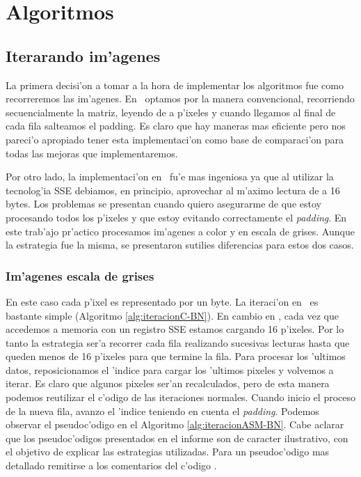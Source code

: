\section{Algoritmos}
\label{sec:algoritmos}

\subsection{Iterarando im'agenes}
La primera decisi'on a tomar a la hora de implementar los algoritmos fue como recorreremos las im'agenes. En \C\ optamos por la manera convencional, recorriendo secuencialmente la matriz, leyendo de a p'ixeles y cuando llegamos al final de cada fila salteamos el padding. Es claro que hay maneras mas eficiente pero nos pareci'o apropiado tener esta implementaci'on como base de comparaci'on para todas las mejoras que implementaremos. 

Por otro lado, la implementaci'on en \ass\ fu'e mas ingeniosa ya que al utilizar la tecnolog'ia SSE debiamos, en principio, aprovechar al m'aximo lectura de a 16 bytes. Los problemas se presentan cuando quiero asegurarme de que estoy procesando todos los p'ixeles y que estoy evitando correctamente el \textit{padding}. En este trab'ajo pr'actico procesamos im'agenes a color y en escala de grises. Aunque la estrategia fue la misma, se presentaron sutilies diferencias para estos dos casos. 


\subsubsection{Im'agenes escala de grises}
En este caso cada p'ixel es representado por un byte. La iteraci'on en \C\ es bastante simple (Algoritmo \ref{alg:iteracionC-BN}). En cambio en \ass, cada vez que accedemos a memoria con un registro SSE estamos cargando 16 p'ixeles. Por lo tanto la estrategia ser'a recorrer cada fila realizando sucesivas lecturas hasta que queden menos de 16 p'ixeles para que termine la fila. Para procesar los 'ultimos datos, reposicionamos el 'indice para cargar los 'ultimos pixeles y volvemos a iterar. Es claro que algunos pixeles ser'an recalculados, pero de esta manera podemos reutilizar el c'odigo de las iteraciones normales. Cuando inicio el proceso de la nueva fila, avanzo el 'indice teniendo en cuenta el \textit{padding}. Podemos observar el pseudoc'odigo en el Algoritmo \ref{alg:iteracionASM-BN}. Cabe aclarar que los pseudoc'odigos presentados en el informe son de caracter ilustrativo, con el objetivo de explicar las estrategias utilizadas. Para un pseudoc'odigo mas detallado remitirse a los comentarios del c'odigo \ass.

